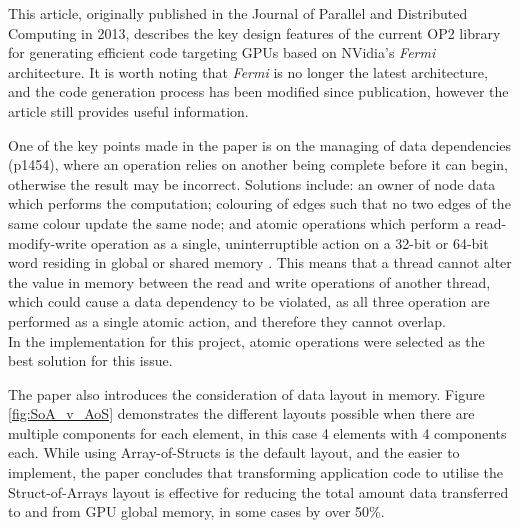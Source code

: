 This article, originally published in the Journal of Parallel and Distributed Computing in 2013, describes the key design features of the current OP2 library for generating efficient code targeting GPUs based on NVidia’s \textit{Fermi} architecture. It is worth noting that \textit{Fermi} is no longer the latest architecture, and the code generation process has been modified since publication, however the article still provides useful information.
\par
One of the key points made in the paper is on the managing of data dependencies (p1454), where an operation relies on another being complete before it can begin, otherwise the result may be incorrect. Solutions include: an owner of node data which performs the computation; colouring of edges such that no two edges of the same colour update the same node; and atomic operations which perform a read-modify-write operation as a single, uninterruptible action on a 32-bit or 64-bit word residing in global or shared memory \cite[p96]{guide}. This means that a thread cannot alter the value in memory between the read and write operations of another thread, which could cause a data dependency to be violated, as all three operation are performed as a single atomic action, and therefore they cannot overlap. \\In the implementation for this project, atomic operations were selected as the best solution for this issue.
\par
The paper also introduces the consideration of data layout in memory. Figure \ref{fig:SoA_v_AoS} demonstrates the different layouts possible when there are multiple components for each element, in this case 4 elements with 4 components each. While using Array-of-Structs is the default layout, and the easier to implement, the paper concludes that transforming application code to utilise the Struct-of-Arrays layout is effective for reducing the total amount data transferred to and from GPU global memory, in some cases by over 50\%.


